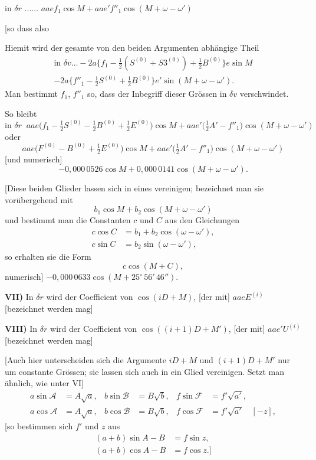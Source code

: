 \documentclass[12pt,a4paper]{article}
\begin{document}
\newpage
\setcounter{page}{403}
%
in $\delta r$ $\ldots\ldots$ $aaef_1 \cos M + aa e' f''_1 \cos(M + \omega - \omega')$

[so dass also

Hiemit wird der gesamte von den beiden Argumenten abhängige Theil
\begin{multline*}
\text{in } \delta v \ldots -2a\{f_1 - \tfrac{1}{2}(S^{(0)} + S3^{(0)}) + \tfrac{1}{2} B^{(0)}\} e \sin M\\
- 2a\{f''_1 - \tfrac{1}{2} S^{(0)} + \tfrac{1}{2} B^{(0)}\} e' \sin(M + \omega - \omega').
\end{multline*}
Man bestimmt $f_1$, $f''_1$ so, dass der Inbegriff dieser Grössen in $\delta v$ verschwindet.

So bleibt
\[\text{in } \delta r\;\; aa e\bigl(f_1 - \tfrac{1}{2} S^{(0)} - \tfrac{1}{2} B^{(0)} + \tfrac{1}{2} E^{(0)}\bigr) \cos M + aae'\bigl(\tfrac{1}{2} A' - f''_1\bigr) \cos(M + \omega - \omega')\]
oder
\[aa e\bigl(F^{(0)} - B^{(0)} + \tfrac{1}{2} E^{(0)}\bigr) \cos M + aa e'\bigl(\tfrac{1}{2} A' - f''_1\bigr) \cos(M + \omega - \omega')\]
[und numerisch]
\[-0{,}000\,0526 \cos M + 0{,}000\,0141 \cos(M + \omega - \omega').\]

[Diese beiden Glieder lassen sich in eines vereinigen; bezeichnet man sie vorübergehend mit
\[b_1 \cos M + b_2 \cos(M + \omega - \omega')\]
und bestimmt man die Constanten $c$ und $C$ aus den Gleichungen
\begin{align*}
c \cos C &= b_1 + b_2 \cos(\omega - \omega'),\\
c \sin C &= b_2 \sin(\omega - \omega'),
\end{align*}
so erhalten sie die Form
\[c \cos(M + C),\]
numerisch] $-0{,}000\,0633 \cos(M + 25^\circ\,56'\,46'')$.

\medskip\noindent
\textbf{VII)} In $\delta r$ wird der Coefficient von $\cos(iD + M)$, [der mit] $aa e E^{(i)}$ [bezeichnet werden mag]

\medskip\noindent
\textbf{VIII)} In $\delta r$ wird der Coefficient von $\cos((i+1)D + M')$, [der mit] $aa e' U^{(i)}$ [bezeichnet werden mag]

\newpage
\setcounter{page}{404}
%
[Auch hier unterscheiden sich die Argumente $iD + M$ und $(i+1)D + M'$ nur um constante Grössen; sie lassen sich auch in ein Glied vereinigen. Setzt man ähnlich, wie unter VI]
\begin{align*}
a \sin \mathcal{A} &= A\sqrt{a}, & b \sin \mathcal{B} &= B\sqrt{b}, & f \sin \mathcal{F} &= f'\sqrt{a'},\\
a \cos \mathcal{A} &= A\sqrt{a}, & b \cos \mathcal{B} &= B\sqrt{b}, & f \cos \mathcal{F} &= f'\sqrt{a'} \quad [-z],
\end{align*}
[so bestimmen sich $f'$ und $z$ aus
\begin{align*}
(a+b) \sin A - B &= f \sin z,\\
(a+b) \cos A - B &= f \cos z.\text{]}
\end{align*}
\end{document}
